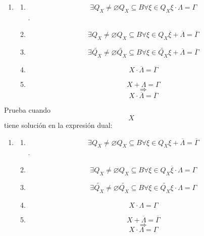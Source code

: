 \begin{enumerate}
\begin{enumerate}
\begin{enumerate}
\begin{enumerate}
\begin{enumerate}
          \begin{enumerate}
          \def\labelenumvi{\arabic{enumvi}.}
          \tightlist
          \item
            \begin{enumerate}
            \def\labelenumvii{\arabic{enumvii}.}
            \tightlist
            \item
              \[\exists{Q_{X} \neq \varnothing}{Q_{X} \subseteq B}\forall{\xi \in Q_{X}}{{\xi \cdot \Lambda} = \Gamma}\].
            \item
              \[\exists{Q_{X} \neq \varnothing}{Q_{X} \subseteq B}\forall{\xi \in Q_{X}}{{\overline{\xi} + \overline{\Lambda}} = \overline{\Gamma}}\]
            \item
              \[\exists{\widetilde{Q_{X}} \neq \varnothing}{\widetilde{Q_{X}} \subseteq B}\forall{\xi \in \widetilde{Q_{X}}}{{\xi + \overline{\Lambda}} = \overline{\Gamma}}\]
            \item
              \[{X \cdot \overline{\Lambda}} = \overline{\Gamma}\]
            \item
              \[{X + \Lambda} = \Gamma\] \[\Rightarrow\]
              \[{X \cdot \overline{\Lambda}} = \overline{\Gamma}\]
            \end{enumerate}
          \end{enumerate}

          Prueba cuando \[X\] tiene solución en la expresión dual:

          \begin{enumerate}
          \def\labelenumvi{\arabic{enumvi}.}
          \tightlist
          \item
            \begin{enumerate}
            \def\labelenumvii{\arabic{enumvii}.}
            \tightlist
            \item
              \[\exists{Q_{X} \neq \varnothing}{Q_{X} \subseteq B}\forall{\xi \in Q_{X}}{{\xi + \overline{\Lambda}} = \overline{\Gamma}}\].
            \item
              \[\exists{Q_{X} \neq \varnothing}{Q_{X} \subseteq B}\forall{\xi \in Q_{X}}{{\overline{\xi} \cdot \Lambda} = \Gamma}\]
            \item
              \[\exists{\widetilde{Q_{X}} \neq \varnothing}{\widetilde{Q_{X}} \subseteq B}\forall{\xi \in \widetilde{Q_{X}}}{{\xi \cdot \Lambda} = \Gamma}\]
            \item
              \[{X \cdot \Lambda} = \Gamma\]
            \item
              \[{X + \overline{\Lambda}} = \overline{\Gamma}\]
              \[\Rightarrow\] \[{X \cdot \Lambda} = \Gamma\]
            \end{enumerate}
          \end{enumerate}


\end{enumerate}
\end{enumerate}
\end{enumerate}
\end{enumerate}
\end{enumerate}
